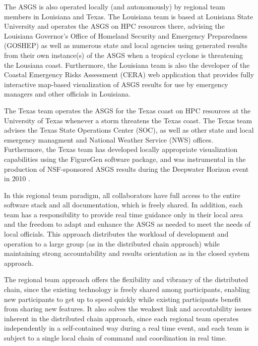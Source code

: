 \documentclass[jmse,article,submit,moreauthors,pdftex,12pt,a4paper]{mdpi}
\begin{document}
The ASGS is also operated locally (and autonomously) by regional 
team members in Louisiana and Texas. The Louisiana team is based at 
Louisiana State University and operates the ASGS on HPC resources 
there, advising the Louisiana Governor's Office of Homeland Security 
and Emergency Preparedness (GOSHEP)  as well as numerous state and 
local agencies using generated results from their own instance(s) of 
the ASGS when a tropical cyclone is threatening the Lousiana coast. 
Furthermore, the Louisiana team is also the developer of the Coastal 
Emergency Risks Assessment (CERA) web application that provides 
fully interactive map-based visualization of ASGS results for use by 
emergency managers and other officials in Louisiana.

The Texas team operates the ASGS for the Texas coast on HPC 
resources at the University of Texas \cite{DietrichJC2013} whenever
a storm threatens the Texas coast. The Texas team advises the Texas
State Operations Center (SOC), as well as other state and local emergency
managment and National Weather Service (NWS) offices. Furthermore,
the Texas team has developed locally appropriate visualization capabilities
using the FigureGen software package, and was instrumental in the 
production of NSF-sponsored ASGS results during the Deepwater Horizon event 
in 2010 \cite{DietrichJC2012}. 

In this regional team paradigm, all collaborators have full access 
to the entire software stack and all documentation, which is freely 
shared. In addition, each team has a responsibility to provide real 
time guidance only in their local area and the freedom to adapt and 
enhance the ASGS as needed to meet the needs of local officials. 
This approach distributes the workload of development and operation 
to a large group (as in the distributed chain approach) while 
maintaining strong accountability and results orientation as in the 
closed system approach. 

The regional team approach offers the flexibility and vibrancy of 
the distributed chain, since the existing technology is freely 
shared among participants, enabling new participants to get up to 
speed quickly while existing participants benefit from sharing new 
features. It also solves the weakest link and accoutability issues 
inherent in the distributed chain approach, since each regional team 
operates independently in a self-contained way during a real time 
event, and each team is subject to a single local chain of command and 
coordination in real time.
\end{document}
